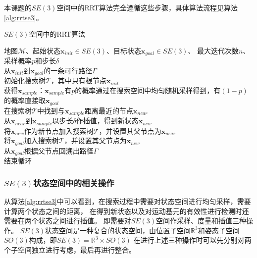 本课题的$SE(3)$空间中的RRT算法完全遵循这些步骤，具体算法流程见算法\ref{alg:rrtse3}。

\begin{algorithm}[H]
  \wuhao
  \caption{$SE(3)$空间中的RRT算法\label{alg:rrtse3}}
  \begin{algorithmic}[1]
    \REQUIRE 地图$\mathcal{M}$、起始状态$\bm{x}_{init} \in SE(3)$、目标状态$\bm{x}_{goal} \in SE(3)$、\newline 
        最大迭代次数$n$、采样概率$p$和步长$\delta$ \\
    \ENSURE 从$\bm{x}_{init}$到$\bm{x}_{goal}$的一条可行路径$\varGamma$ \\
    \STATE 初始化搜索树$\mathcal{T}$，其中只有根节点$\bm{x}_{init}$ \\
      \STATE 获得$\bm{x}_{sample}$：$\bm{x}_{sample}$有$p$的概率通过在搜索空间中均匀随机采样得到，有$(1-p)$的概率直接取$\bm{x}_{goal}$ \\
      \STATE 在搜索树$\mathcal{T}$中找到与$\bm{x}_{sample}$距离最近的节点$\bm{x}_{near}$ \\
      \STATE 从$\bm{x}_{near}$到$\bm{x}_{sample}$以步长$\delta$作插值，得到新状态$\bm{x}_{new}$ \\
        \STATE 将$\bm{x}_{new}$作为新节点加入搜索树$\mathcal{T}$，并设置其父节点为$\bm{x}_{near}$\\
      \ENDIF
        \STATE 将$\bm{x}_{goal}$加入搜索树$\mathcal{T}$，并设置其父节点为$\bm{x}_{new}$ \\
        \STATE 从$\bm{x}_{goal}$根据父节点回溯出路径$\varGamma$ \\
        \STATE 结束循环 \\
      \ENDIF
    \ENDFOR
  \end{algorithmic}
\end{algorithm}

\subsubsection{$SE(3)$状态空间中的相关操作}\label{subsubsec:operations_in_SE3}
从算法\ref{alg:rrtse3}中可以看到，在搜索过程中需要对状态空间进行均匀采样，需要计算两个状态之间的距离，
在得到新状态以及对运动基元的有效性进行检测时还需要在两个状态之间进行插值。
即需要对$SE(3)$空间作采样、度量和插值三种操作。
$SE(3)$状态空间是一种复合的状态空间，由位置子空间$\mathbb{R}^3$和姿态子空间$SO(3)$构成，即$SE(3)=\mathbb{R}^3\times SO(3)$
在进行上述三种操作时可以先分别对两个子空间独立进行考虑，最后再进行整合。

